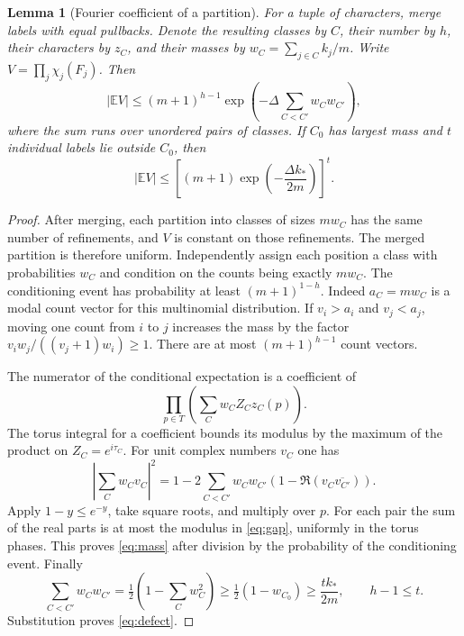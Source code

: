 \documentclass[11pt]{article}
\newtheorem{lemma}[theorem]{Lemma}
\newcommand{\E}{\mathbb E}
\begin{document}
\begin{lemma}[Fourier coefficient of a partition]\label{lem:partition}
For a tuple of characters, merge labels with equal pullbacks. Denote the resulting classes by $C$, their number by $h$, their characters by $z_C$, and their masses by $w_C=\sum_{j\in C}k_j/m$. Write $V=\prod_j\chi_j(F_j)$. Then
\begin{equation}\label{eq:mass}
 |\E V|\le (m+1)^{h-1}
       \exp\!\left(-\Delta\sum_{C<C'}w_Cw_{C'}\right),
\end{equation}
where the sum runs over unordered pairs of classes. If $C_0$ has largest mass and $t$ individual labels lie outside $C_0$, then
\begin{equation}\label{eq:defect}
 |\E V|\le \left[(m+1)\exp\!\left(-\frac{\Delta k_*}{2m}\right)\right]^t .
\end{equation}
\end{lemma}
\begin{proof}
After merging, each partition into classes of sizes $mw_C$ has the same number of refinements, and $V$ is constant on those refinements. The merged partition is therefore uniform. Independently assign each position a class with probabilities $w_C$ and condition on the counts being exactly $mw_C$. The conditioning event has probability at least $(m+1)^{1-h}$. Indeed $a_C=mw_C$ is a modal count vector for this multinomial distribution. If $v_i>a_i$ and $v_j<a_j$, moving one count from $i$ to $j$ increases the mass by the factor $v_i w_j/((v_j+1)w_i)\ge1$. There are at most $(m+1)^{h-1}$ count vectors.

The numerator of the conditional expectation is a coefficient of
\[
   \prod_{p\in T}\left(\sum_C w_C Z_C z_C(p)\right).
\]
The torus integral for a coefficient bounds its modulus by the maximum of the product on $Z_C=e^{i\tau_C}$. For unit complex numbers $v_C$ one has
\[
 \left|\sum_Cw_Cv_C\right|^2
 =1-2\sum_{C<C'}w_Cw_{C'}(1-\Re(v_C\overline{v_{C'}})).
\]
Apply $1-y\le e^{-y}$, take square roots, and multiply over $p$. For each pair the sum of the real parts is at most the modulus in \eqref{eq:gap}, uniformly in the torus phases. This proves \eqref{eq:mass} after division by the probability of the conditioning event. Finally
\[
  \sum_{C<C'}w_Cw_{C'}=\tfrac12(1-\sum_C w_C^2)
  \ge\tfrac12(1-w_{C_0})\ge\frac{t k_*}{2m},\qquad h-1\le t .
\]
Substitution proves \eqref{eq:defect}.
\end{proof}
\end{document}
